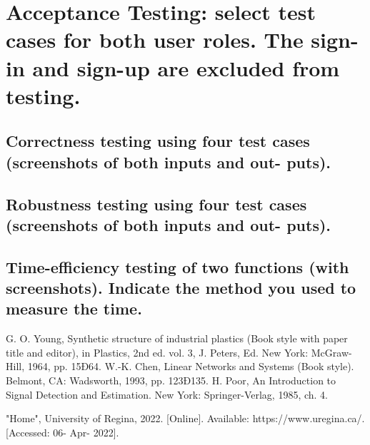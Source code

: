 \documentclass[letterpaper, 12 pt, conference]{ieeeconf}
\begin{document}
\section{Acceptance Testing: select test cases for both user roles. The sign-in and sign-up are excluded from testing.}
\subsection{Correctness testing using four test cases (screenshots of both inputs and out- puts).}
\subsection{Robustness testing using four test cases (screenshots of both inputs and out- puts).}
\subsection{Time-eﬀiciency testing of two functions (with screenshots). Indicate the method you used to measure the time.}



\addtolength{\textheight}{-12cm}








\newpage


\begin{thebibliography}{99}

 G. O. Young, Synthetic structure of industrial plastics (Book style with paper title and editor), 	in Plastics, 2nd ed. vol. 3, J. Peters, Ed.  New York: McGraw-Hill, 1964, pp. 15Ð64.
 W.-K. Chen, Linear Networks and Systems (Book style).	Belmont, CA: Wadsworth, 1993, pp. 123Ð135.
 H. Poor, An Introduction to Signal Detection and Estimation.   New York: Springer-Verlag, 1985, ch. 4.

 "Home", University of Regina, 2022. [Online]. Available: https://www.uregina.ca/. [Accessed: 06- Apr- 2022].

\end{thebibliography}
\end{document}
